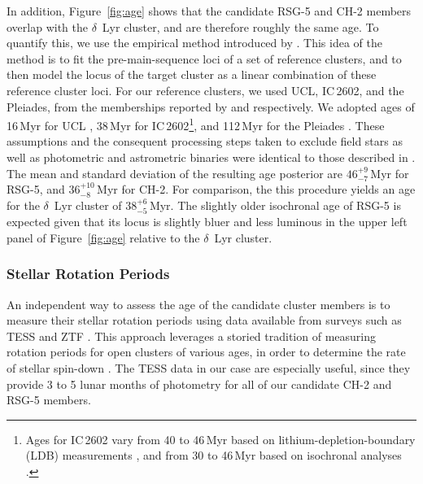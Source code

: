 \documentclass[12pt,twocolumn,linenumbers]{aastex63}
\begin{document}
In addition, Figure~\ref{fig:age} shows that the candidate RSG-5 and
CH-2 members overlap with the $\delta$~Lyr cluster, and are therefore
roughly the same age.  To quantify this, we use the empirical method
introduced by \citet[][see their Section~6.3]{gagne_mutau_2020}.  This
idea of the method is to fit the pre-main-sequence loci of a set of
reference clusters, and to then model the locus of the target cluster
as a linear combination of these reference cluster loci.  For our
reference clusters, we used UCL, IC\,2602, and the Pleiades, from the
memberships reported by \citet{Damiani2019} and
\cite{CantatGaudin2018a} respectively.  We adopted ages of 16\,Myr for
UCL \citep{pecaut_star_2016}, 38\,Myr for IC\,2602\footnote{ Ages for
IC\,2602 vary from 40 to 46\,Myr based on lithium-depletion-boundary
(LDB) measurements \citep{dobbie_ic_2010,randich_gaiaeso_2018}, and
from 30 to 46\,Myr based on isochronal analyses
\citep{stauffer_rotational_1997,david_ages_2015,bossini_age_2019}.},
and 112\,Myr for the Pleiades \citep{dahm_2015}.  These assumptions
and the consequent processing steps taken to exclude field stars as
well as photometric and astrometric binaries were identical to those
described in \citet{bouma_kep1627_2022}.  The mean and standard
deviation of the resulting age posterior are $46^{+9}_{-7}$\,Myr for
RSG-5, and $36^{+10}_{-8}$\,Myr for CH-2.  For comparison, the this
procedure yields an age for the $\delta$~Lyr cluster of
$38^{+6}_{-5}$\,Myr.  The slightly older isochronal age of RSG-5 is
expected given that its locus is slightly bluer and less luminous in
the upper left panel of Figure~\ref{fig:age} relative to the
$\delta$~Lyr cluster.


\subsubsection{Stellar Rotation Periods}
\label{sec:rotation}

An independent way to assess the age of the candidate cluster members
is to measure their stellar rotation periods using data available from
surveys such as TESS \citep{ricker_transiting_2015} and ZTF
\citep{bellm_zwicky_2019}.  This approach leverages a storied
tradition of measuring rotation periods for open clusters of various
ages, in order to determine the rate of stellar spin-down \citep[{\it
e.g.},][]{skumanich_time_1972,curtis_rup147_2020}.  The TESS data in
our case are especially useful, since they provide 3 to 5 lunar months
of photometry for all of our candidate CH-2 and RSG-5 members.
\end{document}
